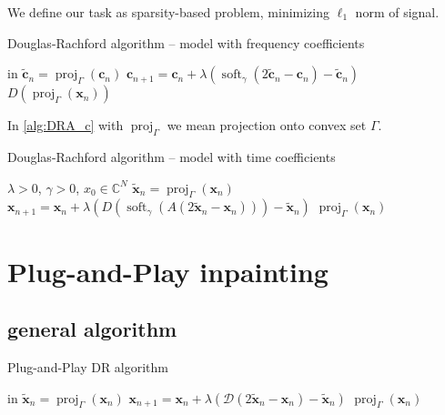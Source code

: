 \documentclass[conference]{IEEEtran}
\begin{document}
We define our task as sparsity-based problem, minimizing $ \ell_1 $ norm of signal.


	
\begin{algorithm}
	\caption{Douglas-Rachford algorithm -- model with frequency coefficients}
	\begin{algorithmic}[1]\label{alg:DRA_c}
		\renewcommand{\algorithmicrequire}{\textbf{Input:}}
		\renewcommand{\algorithmicensure}{\textbf{Output:}}
		\REQUIRE in
		\STATE $\mathbf{\widetilde{c}}_n=\operatorname{proj}_{\Gamma}(\mathbf{c}_n) $ 
		\STATE $ \mathbf{c}_{n+1} = \mathbf{c}_n + \lambda \left( \operatorname{soft}_{\gamma}\left(2\mathbf{\widetilde{c}}_n-\mathbf{c}_n \right)-\mathbf{\widetilde{c}}_n\right)$
		\ENDFOR
		\RETURN $D(\operatorname{proj}_{\Gamma}(\mathbf{x}_n))$ 
	\end{algorithmic} 
\end{algorithm}

In \ref{alg:DRA_c} with $ \operatorname{proj}_{\Gamma} $ we mean projection onto convex set $ \Gamma $.

\begin{algorithm}
	\caption{Douglas-Rachford algorithm -- model with time coefficients}
	\begin{algorithmic}[1]
		\renewcommand{\algorithmicrequire}{\textbf{Input:}}
		\renewcommand{\algorithmicensure}{\textbf{Output:}}
		\REQUIRE $ \lambda > 0 $, $ \gamma>0 $, $ x_0 \in \mathbb{C}^{N} $
		\STATE $\mathbf{\widetilde{x}}_n=\operatorname{proj}_{\Gamma}(\mathbf{x}_n) $ 
		\STATE $ \mathbf{x}_{n+1} = \mathbf{x}_n + \lambda \left( D\left(\operatorname{soft}_{\gamma}\left(A\left(2\mathbf{\widetilde{x}}_n-\mathbf{x}_n\right) \right)\right) -\mathbf{\widetilde{x}}_n\right)$
		\ENDFOR
		\RETURN $\operatorname{proj}_{\Gamma}(\mathbf{x}_n)$ 
	\end{algorithmic} 
\end{algorithm}

\section{Plug-and-Play inpainting} \label{sec:plugaandplay}

\subsection{general algorithm}

\begin{algorithm}
	\caption{Plug-and-Play DR algorithm}
	\begin{algorithmic}[1]
		\renewcommand{\algorithmicrequire}{\textbf{Input:}}
		\renewcommand{\algorithmicensure}{\textbf{Output:}}
		\REQUIRE in
		\STATE $\mathbf{\widetilde{x}}_n=\operatorname{proj}_{\Gamma}(\mathbf{x}_n) $ 
		\STATE $ \mathbf{x}_{n+1} = \mathbf{x}_n + \lambda \left( \mathcal{D} \left(2\mathbf{\widetilde{x}}_n-\mathbf{x}_n \right)-\mathbf{\widetilde{x}}_n\right)$
		\ENDFOR
		\RETURN $\operatorname{proj}_{\Gamma}(\mathbf{x}_n)$ 
	\end{algorithmic} 
\end{algorithm}
\end{document}
